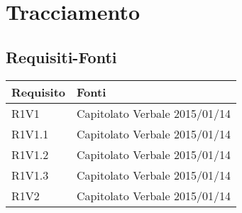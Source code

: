 %


\section{Tracciamento} %
\label{sec:tracciamento}
	\subsection{Requisiti-Fonti} %
	\label{ssub:requisiti_fonti}

	\begin{center}

	\def\arraystretch{1.5}
	\bgroup
	\begin{longtable}{| p{4cm} | p{4cm} |}

		\hline
		\textbf{Requisito} & \textbf{Fonti} \\
		\hline

		R1V1 &  Capitolato \newline Verbale 2015/01/14 \\
		\hline
		R1V1.1  &  Capitolato \newline Verbale 2015/01/14 \\
		\hline
		R1V1.2  &  Capitolato \newline Verbale 2015/01/14 \\
		\hline
		R1V1.3  &  Capitolato \newline Verbale 2015/01/14 \\
		\hline
		R1V2  &  Capitolato \newline Verbale 2015/01/14 \\
		\hline

	\end{longtable}
	\egroup
	\end{center}

	
